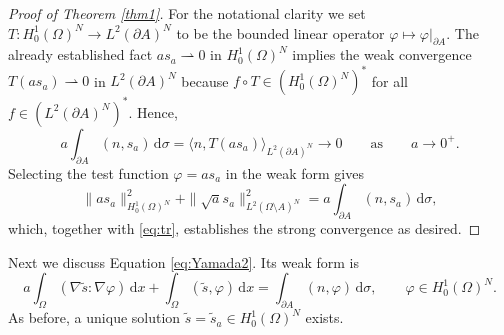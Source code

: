 \documentclass[graybox]{svmult}
\renewcommand{\d}{\mathrm{d}}  %
\renewcommand{\AA}{A}  %
\begin{document}
\begin{proof}[Proof of Theorem \ref{thm1}]
For the notational clarity we set $T\colon H_0^1(\Omega)^N \to L^2(\partial \AA)^N$ to be the bounded linear operator $\varphi \mapsto \varphi|_{\partial\AA}$. The already established fact $a s_a \rightharpoonup 0$ in $H_0^1(\Omega)^N$ implies the weak convergence $T(as_a) \rightharpoonup 0$ in $L^2(\partial \AA)^N$ because $f \circ T \in (H_0^1(\Omega)^N)^*$ for all $f \in (L^2(\partial \AA)^N)^*$.  Hence,  
\begin{equation}\label{eq:tr}
a \int_{\partial \AA}(n,s_a) \,\d \sigma = \langle n, T(as_a)\rangle_{L^2(\partial \AA)^N} \to 0 \qquad \text{as} \qquad a\to0^+. 
\end{equation}
Selecting the test function $\varphi = as_a$ in the weak form gives 
\[
\|a s_a\|_{H_0^1(\Omega)^N}^2 + \|\sqrt{a}s_a\|_{L^2(\Omega\setminus \AA)^N}^2 = a \int_{\partial \AA}(n,s_a) \,\d \sigma, 
\]
which, together with \eqref{eq:tr}, establishes the strong convergence as desired. 
\end{proof}



Next we discuss Equation \eqref{eq:Yamada2}. Its weak form is 
\begin{equation*}\label{eq:yamada2}
a \int_\Omega (\nabla \tilde{s}: \nabla \varphi)\, \d x  + \int_{\Omega}(\tilde{s},\varphi) \, \d x = \int_{\partial \AA} (n,\varphi) \,\d\sigma, \qquad \varphi \in H_0^1(\Omega)^N.   
\end{equation*}
As before, a unique solution $\tilde{s}=\tilde{s}_a \in H_0^1(\Omega)^N$ exists. 
\end{document}
